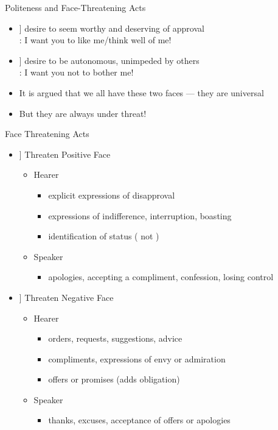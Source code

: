 \documentclass{beamer}
\newcommand{\PF}[1]{\Smiley[#1][green]}
\newcommand{\NF}[1]{\Annoey[#1][red]}
\begin{document}
\begin{frame}{Politeness and Face-Threatening Acts}
\begin{itemize}
\item[\PF{2}]  desire to seem worthy and deserving of approval
  \\ : I want you to like me/think well of me!
\bigskip\bigskip\bigskip
\item[\NF{2}]  desire to be autonomous, unimpeded by others
  \\ : I want you not to bother me!
\bigskip\bigskip\bigskip
\item It is argued that we all have these two faces --- they are universal
\item But they are always under threat!

\end{itemize}

\end{frame}

\begin{frame}{Face Threatening Acts}

\begin{itemize}
\item[\PF{1}] Threaten Positive Face
  \begin{itemize}
  \item Hearer
    \begin{itemize}
    \item explicit expressions of disapproval 
    \item expressions of indifference, interruption, boasting
    \item identification of status ( not )
    \end{itemize}
  \item Speaker
    \begin{itemize}
    \item apologies, accepting a compliment, confession, losing control
    \end{itemize}
  \end{itemize}
\item[\NF{1}] Threaten Negative Face
  \begin{itemize}
  \item Hearer
    \begin{itemize}
    \item orders, requests, suggestions, advice
    \item compliments, expressions of envy or admiration
    \item offers or promises (adds obligation)
    \end{itemize}
  \item Speaker
    \begin{itemize}
    \item thanks, excuses, acceptance of offers or apologies
    \end{itemize}
  \end{itemize}
\end{itemize}

\end{frame}
\end{document}
